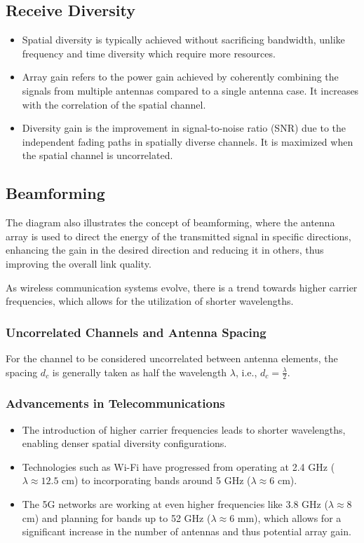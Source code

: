 \subsection*{Receive Diversity}
\begin{itemize}
    \item Spatial diversity is typically achieved without sacrificing bandwidth, unlike frequency and time diversity which require more resources.
    \item Array gain refers to the power gain achieved by coherently combining the signals from multiple antennas compared to a single antenna case. It increases with the correlation of the spatial channel.
    \item Diversity gain is the improvement in signal-to-noise ratio (SNR) due to the independent fading paths in spatially diverse channels. It is maximized when the spatial channel is uncorrelated.
\end{itemize}

\subsection*{Beamforming}
The diagram also illustrates the concept of beamforming, where the antenna array is used to direct the energy of the transmitted signal in specific directions, enhancing the gain in the desired direction and reducing it in others, thus improving the overall link quality.


As wireless communication systems evolve, there is a trend towards higher carrier frequencies, which allows for the utilization of shorter wavelengths.

\subsubsection*{Uncorrelated Channels and Antenna Spacing}
For the channel to be considered uncorrelated between antenna elements, the spacing \( d_c \) is generally taken as half the wavelength \( \lambda \), i.e., \( d_c = \frac{\lambda}{2} \).

\subsubsection*{Advancements in Telecommunications}
\begin{itemize}
    \item The introduction of higher carrier frequencies leads to shorter wavelengths, enabling denser spatial diversity configurations.
    \item Technologies such as Wi-Fi have progressed from operating at 2.4 GHz (\( \lambda \approx 12.5 \) cm) to incorporating bands around 5 GHz (\( \lambda \approx 6 \) cm).
    \item The 5G networks are working at even higher frequencies like 3.8 GHz (\( \lambda \approx 8 \) cm) and planning for bands up to 52 GHz (\( \lambda \approx 6 \) mm), which allows for a significant increase in the number of antennas and thus potential array gain.
\end{itemize}

